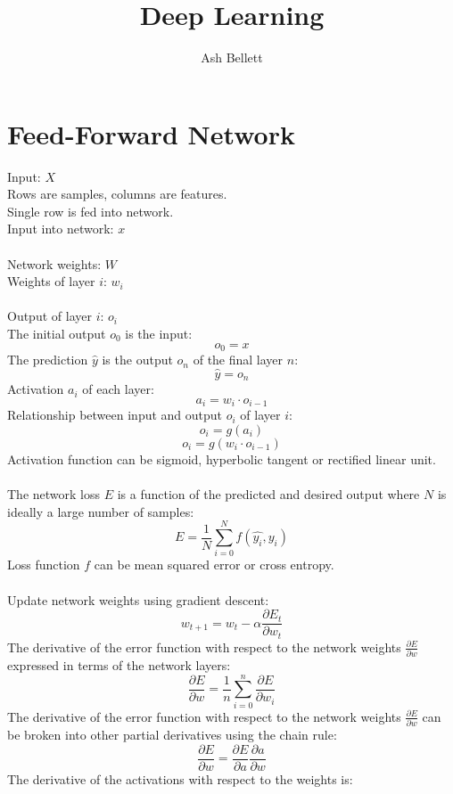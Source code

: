 \documentclass{article}
\title{\textbf{Deep Learning}}
\author{Ash Bellett}
\date{}
\begin{document}
\clearpage
\maketitle
\thispagestyle{empty}
\setcounter{page}{0}
\newpage
\tableofcontents
\setcounter{page}{0}
\newpage

\section{Feed-Forward Network}

Input: $X$\\
Rows are samples, columns are features.\\
Single row is fed into network.\\
Input into network: $x$\\
\\
Network weights: $W$\\
Weights of layer $i$: $w_i$\\
\\
Output of layer $i$: $o_i$\\
The initial output $o_0$ is the input:
\[o_0 = x\]
The prediction $\hat{y}$ is the output $o_n$ of the final layer $n$:
\[ \hat{y} = o_n \]
Activation $a_i$ of each layer:
\[ a_i = w_i \cdot o_{i-1} \]
Relationship between input and output $o_i$ of layer $i$:
\[ o_i = g(a_i) \]
\[ o_i = g(w_i \cdot o_{i-1}) \]
Activation function can be sigmoid, hyperbolic tangent or rectified linear unit.\\
\\
The network loss $E$ is a function of the predicted and desired output where $N$ is ideally a large number of samples:
\[E = \frac{1}{N} \sum_{i=0}^N f(\hat{y_i}, y_i) \]
Loss function $f$ can be mean squared error or cross entropy.\\
\\
Update network weights using gradient descent:
\[ w_{t+1} = w_t - \alpha \frac{\partial E_t}{\partial w_t} \]
The derivative of the error function with respect to the network weights $\frac{\partial E}{\partial w}$ expressed in terms of the network layers:
\[ \frac{\partial E}{\partial w} = \frac{1}{n} \sum_{i=0}^n \frac{\partial E}{\partial w_i} \]
The derivative of the error function with respect to the network weights $\frac{\partial E}{\partial w}$ can be broken into other partial derivatives using the chain rule:
\[ \frac{\partial E}{\partial w} = \frac{\partial E}{\partial a} \frac{\partial a}{\partial w} \]
The derivative of the activations with respect to the weights is:
\end{document}
